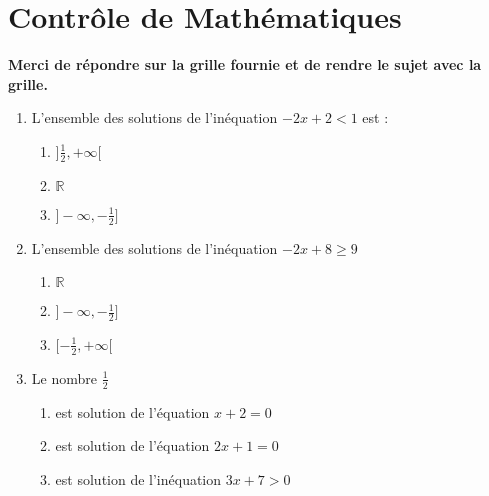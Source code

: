 \documentclass[oneside,twoside]{book}
\begin{document}
\chapter*{Contrôle de Mathématiques}

\let\MauvaiseReponse\null
\let\BonneReponse\null

{\bf Merci de répondre sur la grille fournie et de rendre le sujet avec la grille.}
\vspace{2em}

\begin{enumerate}





\item L'ensemble des solutions de l'inéquation $-2 x+2<1$ est :
\begin{enumerate}
\item\BonneReponse $]\frac{1}{2},+\infty[$
\item\MauvaiseReponse $\mathbb{R}$
\item\MauvaiseReponse $]-\infty, -\frac{1}{2}]$
\end{enumerate}


\item L'ensemble des solutions de l'inéquation $-2x+8 \geqslant 9$

\begin{enumerate}

\item\MauvaiseReponse $\mathbb{R}$


\item\BonneReponse $]-\infty,-\frac{1}{2}]$
\item\MauvaiseReponse $[-\frac{1}{2},+\infty[$

\end{enumerate}





\item Le nombre $\frac{1}{2}$

\begin{enumerate}

\item\MauvaiseReponse est solution de l'équation $x+2=0$
\item\MauvaiseReponse est solution de l'équation $2x+1=0$


\item\BonneReponse est solution de l'inéquation $3x+7>0$

\end{enumerate}




\end{enumerate}
\end{document}
